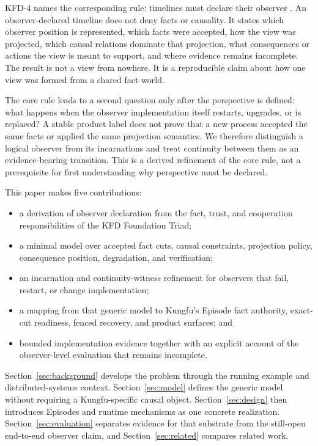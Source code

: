 KFD-4 names the corresponding rule: timelines must declare their observer
\cite{kfd2026observer}. An observer-declared timeline does not deny facts or
causality. It states which observer position is represented, which facts were
accepted, how the view was projected, which causal relations dominate that
projection, what consequences or actions the view is meant to support, and
where evidence remains incomplete. The result is not a view from nowhere. It
is a reproducible claim about how one view was formed from a shared fact world.

The core rule leads to a second question only after the perspective is defined:
what happens when the observer implementation itself restarts, upgrades, or is
replaced? A stable product label does not prove that a new process accepted the
same facts or applied the same projection semantics. We therefore distinguish a
logical observer from its incarnations and treat continuity between them as an
evidence-bearing transition. This is a derived refinement of the core rule, not
a prerequisite for first understanding why perspective must be declared.

This paper makes five contributions:

\begin{itemize}[leftmargin=*]
  \item a derivation of observer declaration from the fact, trust, and
        cooperation responsibilities of the KFD Foundation Triad;
  \item a minimal model over accepted fact cuts, causal constraints, projection
        policy, consequence position, degradation, and verification;
  \item an incarnation and continuity-witness refinement for observers that
        fail, restart, or change implementation;
  \item a mapping from that generic model to Kungfu's Episode fact authority,
        exact-cut readiness, fenced recovery, and product surfaces; and
  \item bounded implementation evidence together with an explicit account of
        the observer-level evaluation that remains incomplete.
\end{itemize}

Section~\ref{sec:background} develops the problem through the running example
and distributed-systems context. Section~\ref{sec:model} defines the generic
model without requiring a Kungfu-specific causal object. Section~\ref{sec:design}
then introduces Episodes and runtime mechanisms as one concrete realization.
Section~\ref{sec:evaluation} separates evidence for that substrate from the
still-open end-to-end observer claim, and Section~\ref{sec:related} compares
related work.

